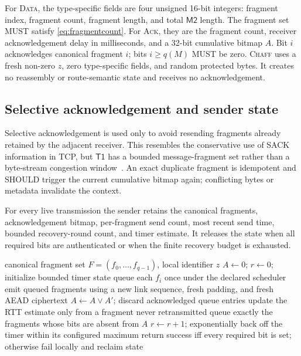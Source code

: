 \documentclass[11pt,oneside]{article}
\newcommand{\Mtwo}{\ensuremath{\mathsf{M2}}}
\newcommand{\Tone}{\ensuremath{\mathsf{T1}}}
\begin{document}
For \textsc{Data}, the type-specific fields are four unsigned 16-bit integers: fragment index, fragment count, fragment length, and total \Mtwo{} length. The fragment set MUST satisfy \cref{eq:fragmentcount}. For \textsc{Ack}, they are the fragment count, receiver acknowledgement delay in milliseconds, and a 32-bit cumulative bitmap $A$. Bit $i$ acknowledges canonical fragment $i$; bits $i\ge q(M)$ MUST be zero. \textsc{Chaff} uses a fresh non-zero $z$, zero type-specific fields, and random protected bytes. It creates no reassembly or route-semantic state and receives no acknowledgement.

\subsection{Selective acknowledgement and sender state}

Selective acknowledgement is used only to avoid resending fragments already retained by the adjacent receiver. This resembles the conservative use of SACK information in TCP, but \Tone{} has a bounded message-fragment set rather than a byte-stream congestion window~\cite{rfc6675}. An exact duplicate fragment is idempotent and SHOULD trigger the current cumulative bitmap again; conflicting bytes or metadata invalidate the context.

For every live transmission the sender retains the canonical fragments, acknowledgement bitmap, per-fragment send count, most recent send time, bounded recovery-round count, and timer estimate. It releases the state when all required bits are authenticated or when the finite recovery budget is exhausted.

\begin{algorithm}[ht]
\caption{Hop-local selective recovery}
\label{alg:t1recovery}
\begin{algorithmic}[1]
\Require canonical fragment set $F=(f_0,\ldots,f_{q-1})$, local identifier $z$
\State $A\gets0$; $r\gets0$; initialize bounded timer state
\State queue each $f_i$ once under the declared scheduler
  \State emit queued fragments using a new link sequence, fresh padding, and fresh AEAD ciphertext
    \State $A\gets A\lor A'$; discard acknowledged queue entries
    \State update the RTT estimate only from a fragment never retransmitted
    \State queue exactly the fragments whose bits are absent from $A$
    \State $r\gets r+1$; exponentially back off the timer within its configured maximum
  \EndIf
\EndWhile
\State return success iff every required bit is set; otherwise fail locally and reclaim state
\end{algorithmic}
\end{algorithm}
\end{document}

